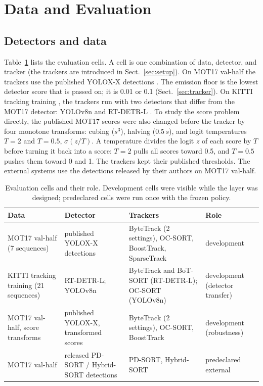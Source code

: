 \documentclass[pdflatex,referee,sn-mathphys-num]{sn-jnl}
\begin{document}
\section{Data and Evaluation}\label{sec:data-eval}

\subsection{Detectors and data}\label{sec:data}
Table~\ref{tab:data} lists the evaluation cells. A cell is one combination of
data, detector, and tracker (the trackers are introduced in
Sect.~\ref{sec:setup}). On MOT17 val-half \cite{milan2016mot16} the trackers
use the published YOLOX-X detections \cite{ge2021yolox}. The emission floor is
the lowest detector score that is passed on; it is 0.01 or 0.1
(Sect.~\ref{sec:tracker}). On KITTI tracking training \cite{geiger2012kitti},
the trackers run with two detectors that differ from the MOT17 detector:
YOLOv8n \cite{jocher2023yolov8} and RT-DETR-L \cite{zhao2024rtdetr}. To study
the score problem directly, the published MOT17 scores were also changed
before the tracker by four monotone transforms: cubing ($s^3$), halving ($0.5\,s$),
and logit temperatures $T=2$ and $T=0.5$, $\sigma(z/T)$. A temperature
divides the logit $z$ of each score by $T$ before turning it back into a
score: $T=2$ pulls all scores toward 0.5, and $T=0.5$ pushes them toward 0
and 1. The trackers kept their published thresholds. The external systems use the detections released
by their authors on MOT17 val-half.

\begin{table}[t]
\caption{Evaluation cells and their role. Development cells were visible while
the layer was designed; predeclared cells were run once with the frozen
policy.}
\label{tab:data}
\centering\footnotesize
\setlength{\tabcolsep}{4pt}
\begin{tabular}{@{}>{\raggedright\arraybackslash}p{29mm}>{\raggedright\arraybackslash}p{25mm}>{\raggedright\arraybackslash}p{42mm}>{\raggedright\arraybackslash}p{25mm}@{}}
\toprule
Data & Detector & Trackers & Role\\
\midrule
MOT17 val-half (7 sequences) & published YOLOX-X detections & ByteTrack (2 settings), OC-SORT, BoostTrack, SparseTrack & development\\
KITTI tracking training (21 sequences) & RT-DETR-L; YOLOv8n & ByteTrack and BoT-SORT (RT-DETR-L); OC-SORT (YOLOv8n) & development (detector transfer)\\
MOT17 val-half, score transforms & published YOLOX-X, transformed scores & ByteTrack (2 settings), OC-SORT, BoostTrack & development (robustness)\\
MOT17 val-half & released PD-SORT / Hybrid-SORT detections & PD-SORT, Hybrid-SORT & predeclared external\\
\bottomrule
\end{tabular}
\end{table}
\end{document}
